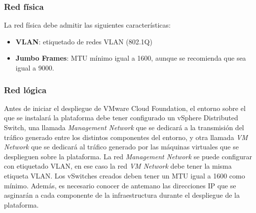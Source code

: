 \subsubsection{Red física}
\label{subsubsec:redFisica}
La red física debe admitir las siguientes características:
\begin{itemize}
    \item \textbf{VLAN}: etiquetado de redes VLAN (802.1Q)
    \item \textbf{Jumbo Frames}: MTU mínimo igual a 1600, aunque se recomienda que sea igual a 9000.
\end{itemize}

\subsubsection{Red lógica}
\label{subsubsec:redLogicaCF}

Antes de iniciar el despliegue de VMware Cloud Foundation, el entorno sobre el que se instalará la plataforma debe tener configurado un vSphere Distributed Switch, una llamada \textit{Management Network} que se dedicará a la transmisión del tráfico generado entre los distintos componentes del entorno, y otra llamada \textit{VM Network} que se dedicará al tráfico generado por las máquinas virtuales que se desplieguen sobre la plataforma. La red \textit{Management Network} se puede configurar con etiquetado VLAN, en ese caso la red \textit{VM Network} debe tener la misma etiqueta VLAN. Los vSwitches creados deben tener un MTU igual a 1600 como mínimo. Además, es necesario conocer de antemano las direcciones IP que se asginarán a cada componente de la infraestructura durante el despliegue de la plataforma.
